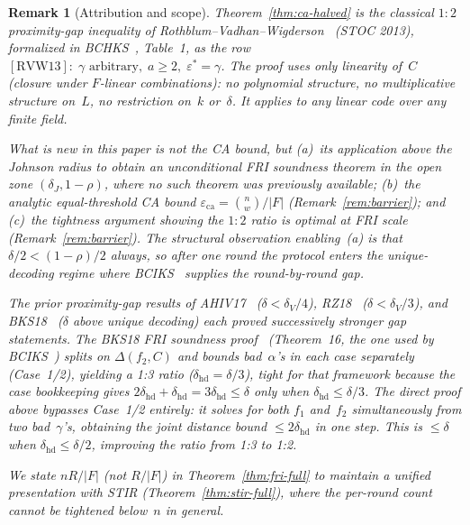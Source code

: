 \documentclass[11pt]{article}
\newtheorem{remark}[theorem]{Remark}
\begin{document}
\begin{remark}[Attribution and scope]
\label{rem:tighter}
Theorem~\ref{thm:ca-halved} is the classical $1{:}2$ proximity-gap inequality of Rothblum--Vadhan--Wigderson~\cite{RVW} (STOC 2013), formalized in BCHKS~\cite{BCHKS}, Table~1, as the row $[\text{RVW13}]{:}\; \gamma\text{ arbitrary},\; a \geq 2,\; \varepsilon^* = \gamma$. The proof uses only linearity of~$C$ (closure under $F$-linear combinations): no polynomial structure, no multiplicative structure on~$L$, no restriction on~$k$ or~$\delta$. It applies to any linear code over any finite field.

\emph{What is new in this paper} is not the CA bound, but (a)~its application \emph{above the Johnson radius} to obtain an unconditional FRI soundness theorem in the open zone $(\delta_J, 1{-}\rho)$, where no such theorem was previously available; (b)~the analytic equal-threshold CA bound $\varepsilon_{\mathrm{ca}} = \binom{n}{w}/|F|$ (Remark~\ref{rem:barrier}); and (c)~the tightness argument showing the $1{:}2$ ratio is optimal at FRI scale (Remark~\ref{rem:barrier}). The structural observation enabling~(a) is that $\delta/2 < (1{-}\rho)/2$ always, so after one round the protocol enters the unique-decoding regime where BCIKS~\cite{BCIKS} supplies the round-by-round gap.

The prior proximity-gap results of AHIV17~\cite{AHIV} ($\delta < \delta_V/4$), RZ18~\cite{RZ} ($\delta < \delta_V/3$), and BKS18~\cite{BKS} ($\delta$ above unique decoding) each proved successively stronger gap statements. The BKS18 FRI soundness proof~\cite{BKS} (Theorem~16, the one used by BCIKS~\cite{BCIKS}) splits on $\Delta(f_2, C)$ and bounds bad~$\alpha$'s in each case separately (\emph{Case~1/2}), yielding a 1:3 ratio ($\delta_{\mathrm{hd}} = \delta/3$), tight for that framework because the case bookkeeping gives $2\delta_{\mathrm{hd}} + \delta_{\mathrm{hd}} = 3\delta_{\mathrm{hd}} \leq \delta$ only when $\delta_{\mathrm{hd}} \leq \delta/3$. The direct proof above bypasses Case~1/2 entirely: it solves for \emph{both} $f_1$ and~$f_2$ simultaneously from two bad~$\gamma$'s, obtaining the \emph{joint} distance bound $\leq 2\delta_{\mathrm{hd}}$ in one step. This is $\leq \delta$ when $\delta_{\mathrm{hd}} \leq \delta/2$, improving the ratio from 1:3 to 1:2.

We state $nR/|F|$ (not $R/|F|$) in Theorem~\ref{thm:fri-full} to maintain a unified presentation with STIR (Theorem~\ref{thm:stir-full}), where the per-round count cannot be tightened below~$n$ in general.
\end{remark}
\end{document}
